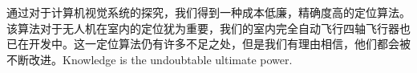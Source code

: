 通过对于计算机视觉系统的探究，我们得到一种成本低廉，精确度高的定位算法。该算法对于无人机在室内的定位犹为重要，我们的室内完全自动飞行四轴飞行器也已在开发中。这一定位算法仍有许多不足之处，但是我们有理由相信，他们都会被不断改进。Knowledge is the undoubtable ultimate power.